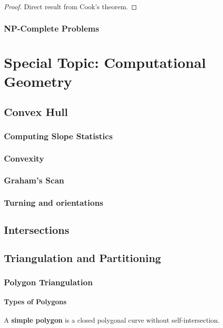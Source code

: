 				\begin{proof}
					Direct result from Cook's theorem.
				\end{proof}

			\section{NP-Complete Problems}

	\part*{Special Topic: Computational Geometry}\label{CG}
		\chapter{Convex Hull}
			\section{Computing Slope Statistics}

			\section{Convexity}

			\section{Graham's Scan}

			\section{Turning and orientations}

		\chapter{Intersections}

		\chapter{Triangulation and Partitioning}
			\section{Polygon Triangulation}
				\subsection{Types of Polygons}
					\begin{definition}
						A \textbf{simple polygon} is a closed polygonal curve without self-intersection.
					\end{definition}

